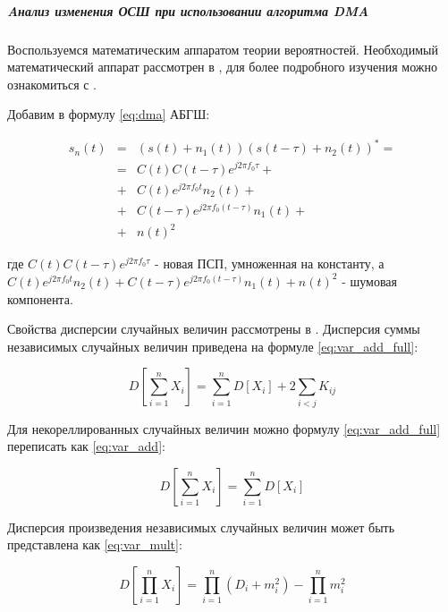 \subparagraph{Aнализ изменения ОСШ при использовании алгоритма DMA}
\label{sssec:dma_noise}

Воспользуемся математическим аппаратом теории вероятностей. Необходимый математический аппарат
рассмотрен в \cite{ventcel}, для более подробного изучения можно ознакомиться с \cite{feller}.

Добавим в формулу \ref{eq:dma} АБГШ:

\begin{center}
\begin{eqnarray}
	s_{n}(t) & = & (s(t)+n_{1}(t))(s(t-\tau)+n_{2}(t))^{*}=\nonumber \\
	 & = & C(t)C(t-\tau)e^{j2{\pi}f_{0}{\tau}}+\nonumber \\
	 & + & C(t)e^{j2{\pi}f_{0}t}n_{2}(t)+\label{eq:dma_noise_1}\\
	 & + & C(t-\tau)e^{j2{\pi}f_{0}(t-\tau)}n_{1}(t)+\nonumber \\
	 & + & n(t)^{2}\nonumber 
\end{eqnarray}
\end{center}

где
$C(t)C(t-\tau)e^{j2{\pi}f_{0}{\tau}}$ - новая ПСП, умноженная на константу, а
$C(t)e^{j2{\pi}f_{0}t}n_{2}(t)+C(t-\tau)e^{j2{\pi}f_{0}(t-\tau)}n_{1}(t) + n(t)^{2}$ -
шумовая компонента.

Свойства дисперсии случайных величин рассмотрены в \cite{ventcel}. Дисперсия суммы 
независимых случайных величин приведена на формуле \ref{eq:var_add_full}:

\begin{center}
\begin{equation}
	\label{eq:var_add_full}
	D[\sum\limits_{i=1}^{n}{X_i}]=\sum\limits_{i=1}^{n}{D[X_i]} + 2\sum\limits_{i<j}{K_{ij}}
\end{equation}
\end{center}

Для некореллированных случайных величин можно формулу \ref{eq:var_add_full} переписать как \ref{eq:var_add}:

\begin{center}
\begin{equation}
	\label{eq:var_add}
	D[\sum\limits_{i=1}^{n}{X_i}]=\sum\limits_{i=1}^{n}{D[X_i]}
\end{equation}
\end{center}

Дисперсия произведения независимых случайных величин может быть представлена как \ref{eq:var_mult}:
\begin{center}
\begin{equation}
	\label{eq:var_mult}
	D[\prod\limits_{i=1}^{n}{X_i}]=\prod\limits_{i=1}^{n}{(D_i + m_{i}^{2})} - \prod\limits_{i=1}^{n}{m_{i}^{2}}
\end{equation}
\end{center}

